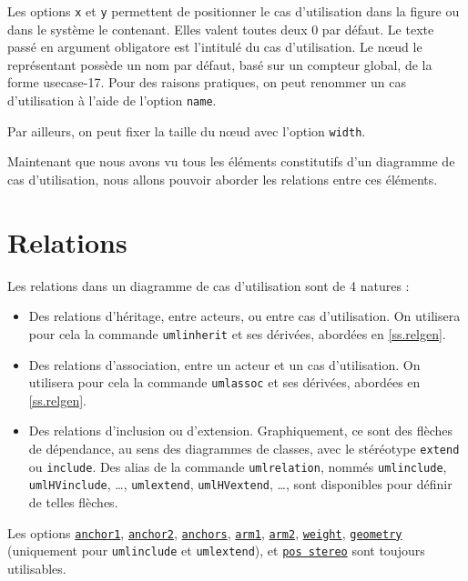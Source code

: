 \documentclass[a4paper,11pt]{report}
\begin{document}
\medskip

Les options {\tt x} et {\tt y} permettent de positionner le cas d'utilisation dans la figure ou dans le système le contenant. Elles valent toutes deux 0 par défaut. Le texte passé en argument obligatore est l'intitulé du cas d'utilisation. Le n\oe{}ud le représentant possède un nom par défaut, basé sur un compteur global, de la forme usecase-17. Pour des raisons pratiques, on peut renommer un cas d'utilisation à l'aide de l'option {\tt name}.

Par ailleurs, on peut fixer la taille du n\oe{}ud avec l'option {\tt width}.

\medskip

Maintenant que nous avons vu tous les éléments constitutifs d'un diagramme de cas d'utilisation, nous allons pouvoir aborder les relations entre ces éléments.

\section{Relations}\label{s.userel}

Les relations dans un diagramme de cas d'utilisation sont de 4 natures :

\begin{itemize}
\item Des relations d'héritage, entre acteurs, ou entre cas d'utilisation. On utilisera pour cela la commande {\tt umlinherit} et ses dérivées, abordées en \autoref{ss.relgen}.
\item Des relations d'association, entre un acteur et un cas d'utilisation. On utilisera pour cela la commande {\tt umlassoc} et ses dérivées, abordées en \autoref{ss.relgen}.
\item Des relations d'inclusion ou d'extension. Graphiquement, ce sont des flèches de dépendance, au sens des diagrammes de classes, avec le stéréotype {\tt extend} ou {\tt include}. Des alias de la commande {\tt umlrelation}, nommés {\tt umlinclude}, {\tt umlHVinclude}, \ldots, {\tt umlextend}, {\tt umlHVextend}, \ldots, sont disponibles pour définir de telles flèches.
\end{itemize}

Les options \hyperlink{anchor1}{{\tt anchor1}}, \hyperlink{anchor2}{{\tt anchor2}}, \hyperlink{anchors}{{\tt anchors}}, \hyperlink{arm1}{{\tt arm1}}, \hyperlink{arm2}{{\tt arm2}}, \hyperlink{weight}{{\tt weight}}, \hyperlink{geometry}{{\tt geometry}} (uniquement pour {\tt umlinclude} et {\tt umlextend}), et \hyperlink{posstereo}{{\tt pos stereo}} sont toujours utilisables.
\end{document}
